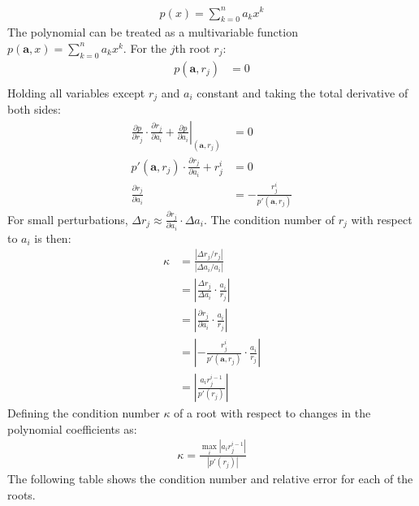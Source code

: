 \documentclass{article}
\begin{document}
\begin{align*}
    p(x) = \sum_{k=0}^n a_kx^k
\end{align*}
The polynomial can be treated as a multivariable function $p(\mathbf{a}, x) = \sum_{k=0}^n a_kx^k$. For the $j$th root $r_j$:
\begin{align*}
    p(\mathbf{a}, r_j) & = 0 \\
\end{align*}
Holding all variables except $r_j$ and $a_i$ constant and taking the total derivative of both sides:
\begin{align*}
    \left.\frac{\partial p}{\partial r_j} \cdot \frac{\partial r_j}{\partial a_i} + \frac{\partial p}{\partial a_i}\right\vert_{(\mathbf{a}, r_j)} & = 0 \\
    p'(\mathbf{a}, r_j) \cdot \frac{\partial r_j}{\partial a_i} + r_j^i & = 0 \\
    \frac{\partial r_j}{\partial a_i} & = -\frac{r_j^i}{p'(\mathbf{a}, r_j)}
\end{align*}
For small perturbations, $\Delta r_j \approx \frac{\partial r_j}{\partial a_i} \cdot \Delta a_i$. The condition number of $r_j$ with respect to $a_i$ is then:
\begin{align*}
    \kappa & = \frac{|\Delta r_j/r_j|}{|\Delta a_i/a_i|} \\
    & = \left|\frac{\Delta r_j}{\Delta a_i} \cdot \frac{a_i}{r_j}\right| \\
    & = \left|\frac{\partial r_j}{\partial a_i} \cdot \frac{a_i}{r_j}\right| \\
    & = \left|-\frac{r_j^i}{p'(\mathbf{a}, r_j)} \cdot \frac{a_i}{r_j}\right| \\
    & = \left|\frac{a_ir_j^{i-1}}{p'(r_j)}\right|
\end{align*}
Defining the condition number $\kappa$ of a root with respect to changes in the polynomial coefficients as:
\begin{align*}
    \kappa = \frac{\max_i |a_i r_j^{i-1}|}{|p'(r_j)|}
\end{align*}
The following table shows the condition number and relative error for each of the roots.
\end{document}
